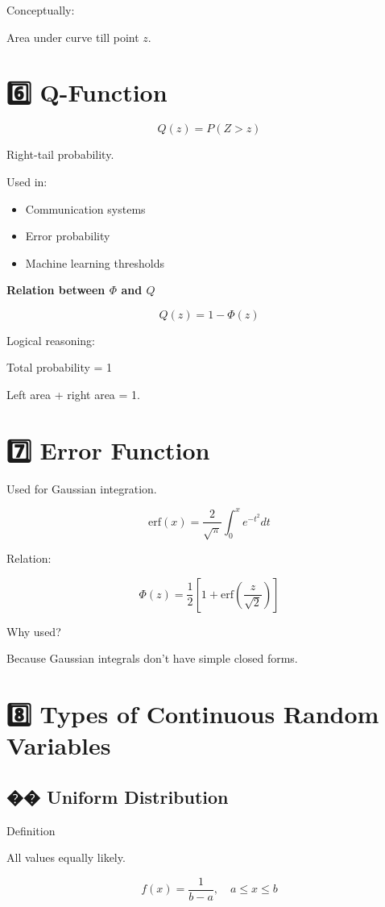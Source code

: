 \documentclass[12pt,a4paper]{article}
\begin{document}
Conceptually:

Area under curve till point $z$.

\section*{6️⃣ Q-Function}

\[
Q(z) = P(Z > z)
\]

Right-tail probability.

Used in:

\begin{itemize}
\item Communication systems
\item Error probability
\item Machine learning thresholds
\end{itemize}

\textbf{Relation between $\Phi$ and $Q$}

\[
Q(z) = 1 - \Phi(z)
\]

Logical reasoning:

Total probability = 1

Left area + right area = 1.

\section*{7️⃣ Error Function}

Used for Gaussian integration.

\[
\text{erf}(x) = \frac{2}{\sqrt{\pi}} \int_0^x e^{-t^2} dt
\]

Relation:

\[
\Phi(z) = \frac{1}{2}\left[1 + \text{erf}\left(\frac{z}{\sqrt{2}}\right)\right]
\]

Why used?

Because Gaussian integrals don’t have simple closed forms.

\section*{8️⃣ Types of Continuous Random Variables}

\subsection*{�� Uniform Distribution}

Definition

All values equally likely.

\[
f(x) = \frac{1}{b-a}, \quad a \le x \le b
\]
\end{document}
